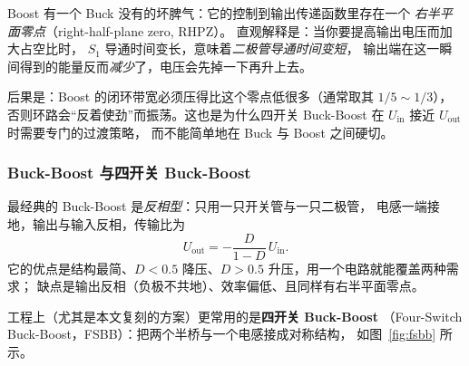 \documentclass[cn,blue,11pt,device=normal]{elegantnote}
\begin{document}
\begin{note}
Boost 有一个 Buck 没有的坏脾气：它的控制到输出传递函数里存在一个
\emph{右半平面零点}（right-half-plane zero, RHPZ）。
直观解释是：当你要提高输出电压而加大占空比时，
$S_1$ 导通时间变长，意味着\emph{二极管导通时间变短}，
输出端在这一瞬间得到的能量反而\emph{减少}了，电压会先掉一下再升上去。

后果是：Boost 的闭环带宽必须压得比这个零点低很多（通常取其 $1/5\sim1/3$），
否则环路会“反着使劲”而振荡。这也是为什么四开关 Buck-Boost 在
$U_{\mathrm{in}}$ 接近 $U_{\mathrm{out}}$ 时需要专门的过渡策略，
而不能简单地在 Buck 与 Boost 之间硬切。
\end{note}

\subsubsection{Buck-Boost 与四开关 Buck-Boost}

最经典的 Buck-Boost 是\emph{反相型}：只用一只开关管与一只二极管，
电感一端接地，输出与输入反相，传输比为
\begin{equation}\label{eq:invbbgain}
  U_{\mathrm{out}} = -\frac{D}{1-D}\,U_{\mathrm{in}} .
\end{equation}
它的优点是结构最简、$D<0.5$ 降压、$D>0.5$ 升压，用一个电路就能覆盖两种需求；
缺点是输出反相（负极不共地）、效率偏低、且同样有右半平面零点。

工程上（尤其是本文复刻的方案）更常用的是\textbf{四开关 Buck-Boost}
（Four-Switch Buck-Boost，FSBB）：把两个半桥与一个电感接成对称结构，
如图~\ref{fig:fsbb} 所示。
\end{document}
